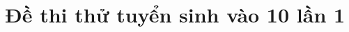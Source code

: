 \documentclass[FileMain.tex]{subfiles}
\gdef\made{208}
\begin{document}
\section[Thi thử lần 1 Thái Hòa  - Nghệ AN  - Mã đề \made]{Đề thi thử tuyển sinh vào 10 lần 1}
%	
%	
%	
\end{document}
